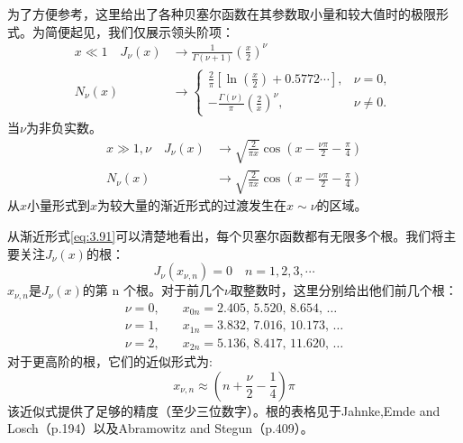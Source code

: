 \documentclass[lang=cn,10pt,newtx,bibend=biber,device=pad]{elegantbook}
\begin{document}
为了方便参考，这里给出了各种贝塞尔函数在其参数取小量和较大值时的极限形式。为简便起见，我们仅展示领头阶项：
\begin{equation}
    \begin{aligned}
    x \ll 1 \quad J_\nu(x) &\to \frac{1}{\Gamma(\nu + 1)} \left( \frac{x}{2} \right)^\nu \\
    N_\nu(x) &\to
\begin{cases}
\frac{2}{\pi} \left[ \ln \left( \frac{x}{2} \right) + 0.5772 \cdots \right], & \nu = 0, \\
-\frac{\Gamma(\nu)}{\pi} \left( \frac{2}{x} \right)^\nu, & \nu \neq 0.
\end{cases}
\end{aligned}
\end{equation}
当$\nu$为非负实数。
\begin{equation}\label{eq:3.91}
    \begin{aligned}
    x \gg 1,\nu \quad J_\nu(x) &\to \sqrt{\frac{2}{\pi x}} \cos \left( x - \frac{\nu\pi}{2} - \frac{\pi}{4} \right)\\
    N_\nu(x) &\to \sqrt{\frac{2}{\pi x}} \cos \left( x - \frac{\nu\pi}{2} - \frac{\pi}{4} \right)
    \end{aligned}
\end{equation}
从$x$小量形式到$x$为较大量的渐近形式的过渡发生在$x \sim  \nu$的区域。

从渐近形式\ref{eq:3.91}可以清楚地看出，每个贝塞尔函数都有无限多个根。我们将主要关注$ J_\nu(x) $的根：
\begin{equation}\label{eq:3.92}
    J_\nu(x_{\nu,n}) = 0 \quad n = 1,2,3,\cdots
\end{equation}
$x_{\nu,n}$是$J_\nu(x)$的第 n 个根。对于前几个$\nu$取整数时，这里分别给出他们前几个根：
\[
\begin{aligned}
\nu = 0, \quad & x_{0n} = 2.405, \, 5.520, \, 8.654, \, \dots \\
\nu = 1, \quad & x_{1n} = 3.832, \, 7.016, \, 10.173, \, \dots \\
\nu = 2, \quad & x_{2n} = 5.136, \, 8.417, \, 11.620, \, \dots
\end{aligned}
\]
对于更高阶的根，它们的近似形式为:
\[
    x_{\nu,n} \approx \left( n + \frac{\nu}{2} - \frac{1}{4} \right) \pi
\]
该近似式提供了足够的精度（至少三位数字）。根的表格见于Jahnke,Emde and Losch（p.194）以及Abramowitz and Stegun（p.409）。
\end{document}
